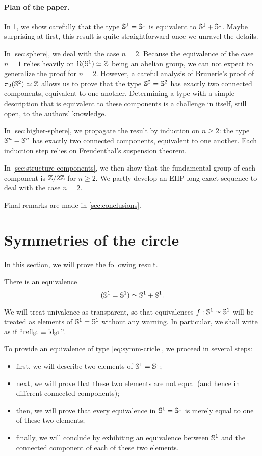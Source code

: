 \documentclass[english,a4paper]{lmcs}
\begin{document}
\paragraph{Plan of the paper.}
In \cref{sec:circle-case}, we show carefully that the type ${{\mathbb S^{1}}} = {{\mathbb S^{1}}}$
is equivalent to ${{\mathbb S^{1}}} + {{\mathbb S^{1}}}$. Maybe surprising at first, this result
is quite straightforward once we unravel the details.

In \cref{sec:sphere}, we deal with the case $n=2$. Because the
equivalence of the case $n=1$ relies heavily on $\Omega({{\mathbb S^{1}}})\simeq \mathbb{Z}$
being an abelian group, we can not expect to generalize the proof for
$n=2$. However, a careful analysis of Brunerie's proof of
$\pi_2({{\mathbb S^{2}}}) \simeq \mathbb{Z}$ allows us to prove that the type ${{\mathbb S^{2}}}={{\mathbb S^{2}}}$ has
exactly two connected components, equivalent to one another.
Determining a type with a simple description that is
equivalent to these components is a challenge in itself, still open,
to the authors' knowledge.

In \cref{sec:higher-sphere}, we propagate the result by induction on
$n\geq 2$: the type ${\mathbb S^{n}} = {\mathbb S^{n}}$ has exactly two connected
components, equivalent to one another. Each induction step relies on
Freudenthal's suspension theorem.

In \cref{sec:structure-components}, we then show that the fundamental group of each component is $\mathbb{Z}/2\mathbb{Z}$ for $n\ge2$.
We partly develop an EHP long exact sequence to deal with the case $n=2$.

Final remarks are made in \cref{sec:conclusions}.

\section{Symmetries of the circle}
\label{sec:circle-case}%

In this section, we will prove the following result.
\begin{thm}
  \label{thm:symmetries-of-S1}
  There is an equivalence
  \begin{equation}
    \label{eq:symm-cricle}%
    (\Sc = \Sc) \weq \Sc+\Sc.
  \end{equation}
\end{thm}
We will treat univalence as transparent, so that equivalences
$f:{{\mathbb S^{1}}}\simeq {{\mathbb S^{1}}}$ will be treated as elements of ${{\mathbb S^{1}}}={{\mathbb S^{1}}}$ without any
warning. In particular, we shall write as if
``$\mathop{{\mathrm{refl}}_{{{\mathbb S^{1}}}}} \equiv \mathord{\mathrm{id}}_{{\mathbb S^{1}}}$''.

To provide an equivalence of type \cref{eq:symm-cricle}, we proceed
in several steps:
\begin{itemize}
\item first, we will describe two elements of ${{\mathbb S^{1}}}={{\mathbb S^{1}}}$;
\item next, we will prove that these two elements are not equal (and
hence in different connected components);
\item then, we will prove that every equivalence in ${{\mathbb S^{1}}}={{\mathbb S^{1}}}$ is
  merely equal to one of these two elements;
\item finally, we will conclude by exhibiting an equivalence between
  ${{\mathbb S^{1}}}$ and the connected component of each of these two elements.
\end{itemize}
\end{document}
